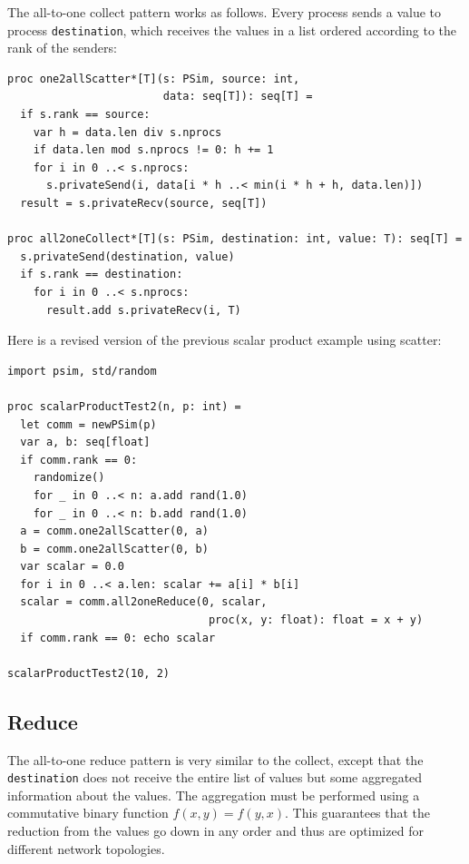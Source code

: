 \documentclass[justified, sixbynine]{tufte-book}
\def\ft{\small\tt}
\theoremstyle{plain}%
\newtheorem * {corollary}{Corollary}
\theoremstyle{definition}
\theoremstyle{remark}
\newtheorem * {remark}{Remark}
\newtheorem * {note}{Note}
\begin{document}
\begin{fullwidth}
The all-to-one collect pattern works as follows. Every process sends a value to process {\ft destination}, which receives the values in a list ordered according to the rank of the senders:

\begin{lstlisting}[caption={in file: {\ft psim.nim}}]
proc one2allScatter*[T](s: PSim, source: int,
                        data: seq[T]): seq[T] =
  if s.rank == source:
    var h = data.len div s.nprocs
    if data.len mod s.nprocs != 0: h += 1
    for i in 0 ..< s.nprocs:
      s.privateSend(i, data[i * h ..< min(i * h + h, data.len)])
  result = s.privateRecv(source, seq[T])

proc all2oneCollect*[T](s: PSim, destination: int, value: T): seq[T] =
  s.privateSend(destination, value)
  if s.rank == destination:
    for i in 0 ..< s.nprocs:
      result.add s.privateRecv(i, T)
\end{lstlisting}

Here is a revised version of the previous scalar product example using scatter:

\begin{lstlisting}[caption={in file: {\ft psim\_scalar2.nim}}]
import psim, std/random

proc scalarProductTest2(n, p: int) =
  let comm = newPSim(p)
  var a, b: seq[float]
  if comm.rank == 0:
    randomize()
    for _ in 0 ..< n: a.add rand(1.0)
    for _ in 0 ..< n: b.add rand(1.0)
  a = comm.one2allScatter(0, a)
  b = comm.one2allScatter(0, b)
  var scalar = 0.0
  for i in 0 ..< a.len: scalar += a[i] * b[i]
  scalar = comm.all2oneReduce(0, scalar,
                               proc(x, y: float): float = x + y)
  if comm.rank == 0: echo scalar

scalarProductTest2(10, 2)
\end{lstlisting}

\goodbreak\subsection{Reduce}

The all-to-one reduce pattern is very similar to the collect, except that the {\ft destination} does not receive the entire list of values but some aggregated information about the values. The aggregation must be performed using a commutative binary function $f(x, y)=f(y, x)$. This guarantees that the reduction from the values go down in any order and thus are optimized for different network topologies.


\end{fullwidth}
\end{document}
